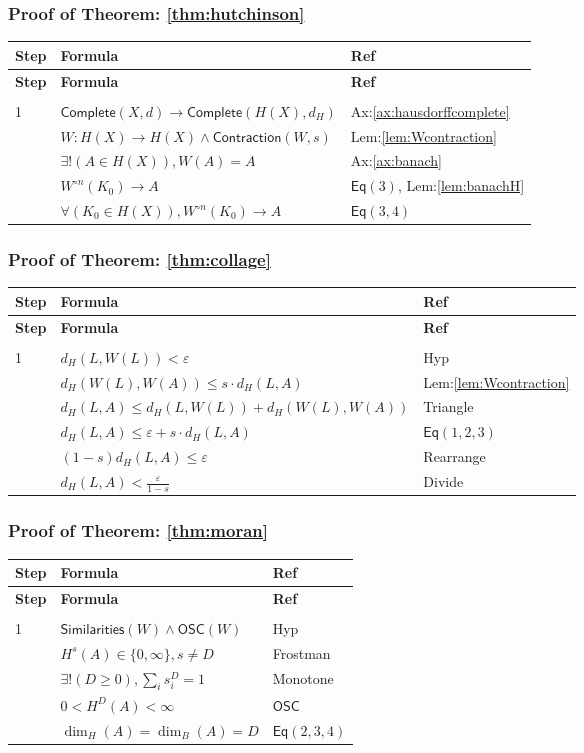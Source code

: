 \documentclass[10pt]{amsart}
\newcommand{\br}{,\allowbreak}
\newcommand{\Forall}{\forall}
\newcommand{\ExistsUniq}{\exists!}
\newenvironment{prooftable}{%
	\renewcommand{\arraystretch}{1.2}%
	\setlength{\tabcolsep}{4pt}%
	\setlength{\arrayrulewidth}{0.05pt}
	\fontsize{6}{7.5}\selectfont
	\sloppy
	\begin{longtable}{
			|>{\centering\arraybackslash}m{0.7cm}|
			>{\raggedright\centering\arraybackslash}m{0.70\textwidth}|
			>{\centering\arraybackslash}m{3.5cm}|
		}%
		\hline
		\textbf{Step} & \centering\textbf{Formula} & \textbf{Ref} \\
		\hline
		\endfirsthead
		\hline
		\textbf{Step} & \centering\textbf{Formula} & \textbf{Ref} \\
		\hline
		\endhead
		\hline
		\multicolumn{3}{r}{\textit{Continued on next page}} \\
		\endfoot
		\hline
		\endlastfoot
	}{%
	\end{longtable}%
}
\theoremstyle{break}
\begin{document}
\subsubsection*{Proof of Theorem: \ref{thm:hutchinson} \cite{Hutchinson1981}}
\begin{prooftable}
	1 & $\mathsf{Complete}(X \br d) \to \mathsf{Complete}(H(X) \br d_H)$ & Ax:\ref{ax:hausdorffcomplete} \\
	\hline
	2 & $W : H(X) \to H(X) \land \mathsf{Contraction}(W \br s)$ & Lem:\ref{lem:Wcontraction} \\
	\hline
	3 & $\ExistsUniq (A \in H(X)) \br W(A) = A$ & Ax:\ref{ax:banach} \\
	\hline
	4 & $W^{\circ n}(K_0) \to A$ & $\mathsf{Eq}(3)$, Lem:\ref{lem:banachH} \\
	\hline
	5 & $\Forall (K_0 \in H(X)) \br W^{\circ n}(K_0) \to A$ & $\mathsf{Eq}(3,4)$ \\
\end{prooftable}

\subsubsection*{Proof of Theorem: \ref{thm:collage} \cite{Barnsley1988}}
\begin{prooftable}
	1 & $d_H(L \br W(L)) < \varepsilon$ & Hyp \\
	\hline
	2 & $d_H(W(L) \br W(A)) \le s \cdot d_H(L \br A)$ & Lem:\ref{lem:Wcontraction} \\
	\hline
	3 & $d_H(L \br A) \le d_H(L \br W(L)) + d_H(W(L) \br W(A))$ & Triangle \\
	\hline
	4 & $d_H(L \br A) \le \varepsilon + s \cdot d_H(L \br A)$ & $\mathsf{Eq}(1,2,3)$ \\
	\hline
	5 & $(1-s) d_H(L \br A) \le \varepsilon$ & Rearrange \\
	\hline
	6 & $d_H(L \br A) < \frac{\varepsilon}{1-s}$ & Divide \\
\end{prooftable}

\subsubsection*{Proof of Theorem: \ref{thm:moran} \cite{Moran1946}}
\begin{prooftable}
	1 & $\mathsf{Similarities}(W) \land \mathsf{OSC}(W)$ & Hyp \\
	\hline
	2 & $H^{s}(A) \in \{0 \br \infty\} \br s \ne D$ & Frostman \\
	\hline
	3 & $\ExistsUniq (D \ge 0) \br \sum_i s_i^{D} = 1$ & Monotone \\
	\hline
	4 & $0 < H^{D}(A) < \infty$ & $\mathsf{OSC}$ \\
	\hline
	5 & $\dim_H(A) = \dim_B(A) = D$ & $\mathsf{Eq}(2,3,4)$ \\
\end{prooftable}
\end{document}
